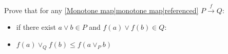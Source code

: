 
Prove that for any \ref{Monotone map|monotone map|referenced} $P \xrightarrow{f} Q$:
    \begin{itemize}
      \item if there exist $a \lor b \in P$ and $f(a) \lor f(b) \in Q$:
      \item $f(a) \lor_Q f(b) \leq f(a \lor_P b)$
    \end{itemize}